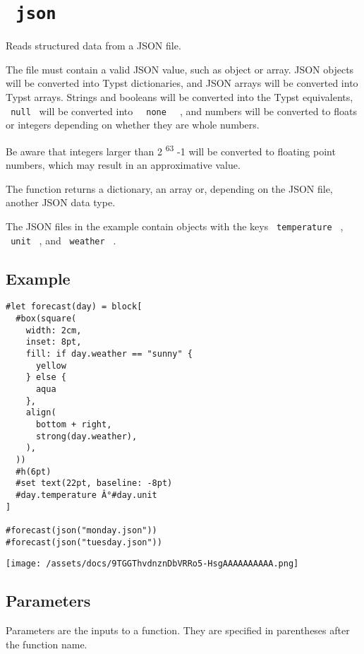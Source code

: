 \section{\texorpdfstring{\texttt{\ json\ }}{ json }}\label{summary}

Reads structured data from a JSON file.

The file must contain a valid JSON value, such as object or array. JSON
objects will be converted into Typst dictionaries, and JSON arrays will
be converted into Typst arrays. Strings and booleans will be converted
into the Typst equivalents, \texttt{\ null\ } will be converted into
\texttt{\ }{\texttt{\ none\ }}\texttt{\ } , and numbers will be
converted to floats or integers depending on whether they are whole
numbers.

Be aware that integers larger than 2 \textsuperscript{63} -1 will be
converted to floating point numbers, which may result in an
approximative value.

The function returns a dictionary, an array or, depending on the JSON
file, another JSON data type.

The JSON files in the example contain objects with the keys
\texttt{\ temperature\ } , \texttt{\ unit\ } , and \texttt{\ weather\ }
.

\subsection{Example}\label{example}

\begin{verbatim}
#let forecast(day) = block[
  #box(square(
    width: 2cm,
    inset: 8pt,
    fill: if day.weather == "sunny" {
      yellow
    } else {
      aqua
    },
    align(
      bottom + right,
      strong(day.weather),
    ),
  ))
  #h(6pt)
  #set text(22pt, baseline: -8pt)
  #day.temperature Â°#day.unit
]

#forecast(json("monday.json"))
#forecast(json("tuesday.json"))
\end{verbatim}

\texttt{[image: /assets/docs/9TGGThvdnznDbVRRo5-HsgAAAAAAAAAA.png]}

\subsection{\texorpdfstring{{ Parameters
}}{ Parameters }}\label{parameters}

\label{parameters-tooltip}
Parameters are the inputs to a function. They are specified in
parentheses after the function name.

